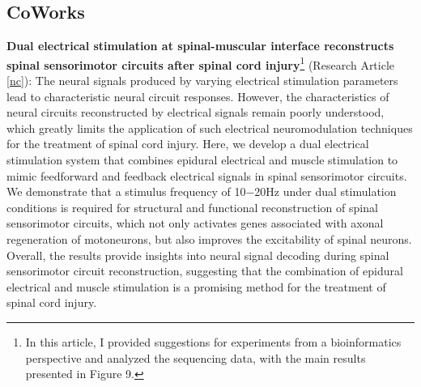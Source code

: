 \clearpage
\subsection{CoWorks}

\textbf{Dual electrical stimulation at spinal-muscular interface reconstructs spinal sensorimotor circuits after spinal cord injury}\footnote{In this article, I provided suggestions for experiments from a bioinformatics perspective and analyzed the sequencing data, with the main results presented in Figure 9.} (Research Article \ref{nc}): The neural signals produced by varying electrical stimulation parameters lead to characteristic neural circuit responses. However, the characteristics of neural circuits reconstructed by electrical signals remain poorly understood, which greatly limits the application of such electrical neuromodulation techniques for the treatment of spinal cord injury. Here, we develop a dual electrical stimulation system that combines epidural electrical and muscle stimulation to mimic feedforward and feedback electrical signals in spinal sensorimotor circuits. We demonstrate that a stimulus frequency of 10−20Hz under dual stimulation conditions is required for structural and functional reconstruction of spinal sensorimotor circuits, which not only activates genes associated with axonal regeneration of motoneurons, but also improves the excitability of spinal neurons. Overall, the results provide insights into neural signal decoding during spinal sensorimotor circuit reconstruction, suggesting that the combination of epidural electrical and muscle stimulation is a promising method for the treatment of spinal cord injury.

